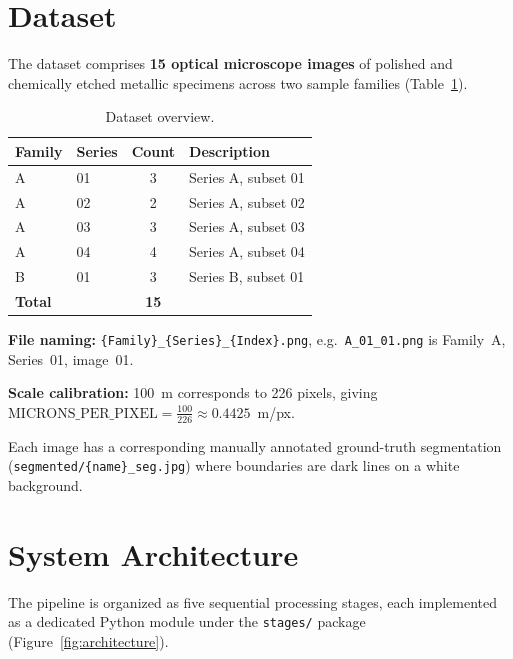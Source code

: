 \documentclass[12pt,a4paper]{article}
\newcommand{\file}[1]{\texttt{\small #1}}
\begin{document}
\section{Dataset}

The dataset comprises \textbf{15 optical microscope images} of polished and
chemically etched metallic specimens across two sample families
(Table~\ref{tab:dataset}).

\begin{table}[H]
    \centering
    \caption{Dataset overview.}
    \label{tab:dataset}
    \begin{tabular}{llcl}
        \toprule
        \textbf{Family} & \textbf{Series} & \textbf{Count} & \textbf{Description} \\
        \midrule
        A & 01 & 3 & Series A, subset 01 \\
        A & 02 & 2 & Series A, subset 02 \\
        A & 03 & 3 & Series A, subset 03 \\
        A & 04 & 4 & Series A, subset 04 \\
        B & 01 & 3 & Series B, subset 01 \\
        \midrule
        \multicolumn{2}{l}{\textbf{Total}} & \textbf{15} & \\
        \bottomrule
    \end{tabular}
\end{table}

\textbf{File naming:} \file{\{Family\}\_\{Series\}\_\{Index\}.png}, e.g.\
\file{A\_01\_01.png} is Family~A, Series~01, image~01.

\textbf{Scale calibration:} 100~\textmu m corresponds to 226 pixels,
giving $\mathrm{MICRONS\_PER\_PIXEL} = \frac{100}{226} \approx 0.4425$~\textmu m/px.

Each image has a corresponding manually annotated ground-truth segmentation
(\file{segmented/\{name\}\_seg.jpg}) where boundaries are dark lines on a
white background.


\section{System Architecture}

The pipeline is organized as five sequential processing stages, each
implemented as a dedicated Python module under the \file{stages/} package
(Figure~\ref{fig:architecture}).
\end{document}
